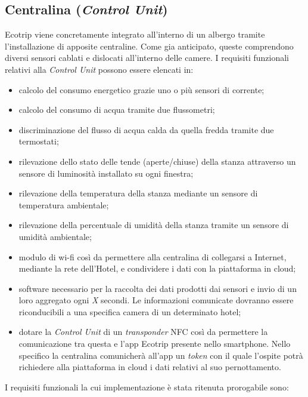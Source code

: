 \subsection{Centralina (\textit{Control Unit})}
Ecotrip viene concretamente integrato all'interno di un albergo tramite l'installazione di apposite centraline. Come gia anticipato, queste comprendono diversi sensori cablati e dislocati all'interno delle camere. I requisiti funzionali relativi alla \textit{Control Unit} possono essere elencati in:
\begin{itemize}
    \item calcolo del consumo energetico grazie uno o più sensori di corrente;
    \item calcolo del consumo di acqua tramite due flussometri;
    \item discriminazione del flusso di acqua calda da quella fredda tramite due termostati;
    \item rilevazione dello stato delle tende (aperte/chiuse) della stanza attraverso un sensore di luminosità installato su ogni finestra;
    \item rilevazione della temperatura della stanza mediante un sensore di temperatura ambientale;
    \item rilevazione della percentuale di umidità della stanza tramite un sensore di umidità ambientale;
    \item modulo di wi-fi così da permettere alla centralina di collegarsi a Internet, mediante la rete dell'Hotel, e condividere i dati con la piattaforma in cloud;
    \item software necessario per la raccolta dei dati prodotti dai sensori e invio di un loro aggregato ogni \textit{X} secondi. Le informazioni comunicate dovranno essere riconducibili a una specifica camera di un determinato hotel;
    \item dotare la \textit{Control Unit} di un \textit{transponder} NFC  così da permettere la comunicazione tra questa e l'app Ecotrip presente nello smartphone. Nello specifico la centralina comunicherà all'app un \textit{token} con il quale l'ospite potrà richiedere alla piattaforma in cloud i dati relativi al suo pernottamento.
\end{itemize}
%
I requisiti funzionali la cui implementazione è stata ritenuta prorogabile sono:
